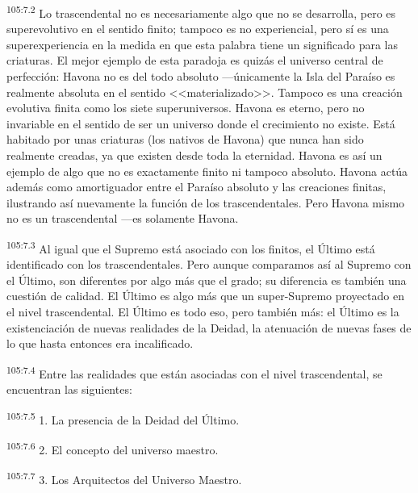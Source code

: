 \par
\textsuperscript{105:7.2} Lo trascendental no es necesariamente algo que no se desarrolla, pero es superevolutivo en el sentido finito; tampoco es no experiencial, pero sí es una superexperiencia en la medida en que esta palabra tiene un significado para las criaturas. El mejor ejemplo de esta paradoja es quizás el universo central de perfección: Havona no es del todo absoluto ---únicamente la Isla del Paraíso es realmente absoluta en el sentido <<materializado>>. Tampoco es una creación evolutiva finita como los siete superuniversos. Havona es eterno, pero no invariable en el sentido de ser un universo donde el crecimiento no existe. Está habitado por unas criaturas (los nativos de Havona) que nunca han sido realmente creadas, ya que existen desde toda la eternidad. Havona es así un ejemplo de algo que no es exactamente finito ni tampoco absoluto. Havona actúa además como amortiguador entre el Paraíso absoluto y las creaciones finitas, ilustrando así nuevamente la función de los trascendentales. Pero Havona mismo no es un trascendental ---es solamente Havona.

\par
\textsuperscript{105:7.3} Al igual que el Supremo está asociado con los finitos, el
Último está identificado con los trascendentales. Pero aunque comparamos así al Supremo con el Último, son diferentes por algo más que el grado; su diferencia es también una cuestión de calidad. El Último es algo más que un super-Supremo proyectado en el nivel trascendental. El Último es todo eso, pero también más: el Último es la existenciación de nuevas realidades de la Deidad, la atenuación de nuevas fases de lo que hasta entonces era incalificado.

\par
\textsuperscript{105:7.4} Entre las realidades que están asociadas con el nivel trascendental, se encuentran las siguientes:

\par
\textsuperscript{105:7.5} 1. La presencia de la Deidad del Último.

\par
\textsuperscript{105:7.6} 2. El concepto del universo maestro.

\par
\textsuperscript{105:7.7} 3. Los Arquitectos del Universo Maestro.

